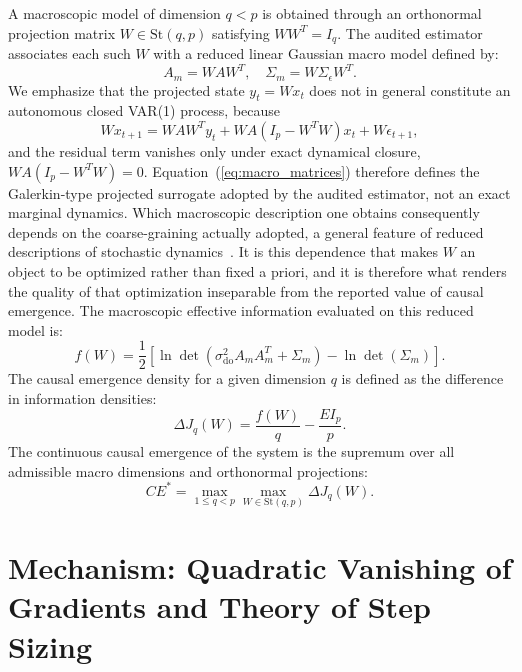 \documentclass[preprint,12pt]{elsarticle}
\begin{document}
A macroscopic model of dimension $q < p$ is obtained through an orthonormal projection matrix $W \in \mathrm{St}(q, p)$ satisfying $W W^T = I_q$. The audited estimator associates each such $W$ with a reduced linear Gaussian macro model defined by:
\begin{equation}
A_m = W A W^T, \quad \Sigma_m = W \Sigma_\epsilon W^T.
\label{eq:macro_matrices}
\end{equation}
We emphasize that the projected state $y_t = W x_t$ does not in general constitute an autonomous closed VAR(1) process, because
\begin{equation}
W x_{t+1} = W A W^T y_t + W A (I_p - W^T W) x_t + W \epsilon_{t+1},
\label{eq:closure_defect}
\end{equation}
and the residual term vanishes only under exact dynamical closure, $W A (I_p - W^T W) = 0$. Equation~(\ref{eq:macro_matrices}) therefore defines the Galerkin-type projected surrogate adopted by the audited estimator, not an exact marginal dynamics. Which macroscopic description one obtains consequently depends on the coarse-graining actually adopted, a general feature of reduced descriptions of stochastic dynamics~\cite{Gaveau2025}. It is this dependence that makes $W$ an object to be optimized rather than fixed a priori, and it is therefore what renders the quality of that optimization inseparable from the reported value of causal emergence. The macroscopic effective information evaluated on this reduced model is:
\begin{equation}
f(W) = \frac{1}{2} \left[ \ln\det(\sigma_{\mathrm{do}}^2 A_m A_m^T + \Sigma_m) - \ln\det(\Sigma_m) \right].
\label{eq:macro_obj}
\end{equation}
The causal emergence density for a given dimension $q$ is defined as the difference in information densities:
\begin{equation}
\Delta J_q(W) = \frac{f(W)}{q} - \frac{EI_p}{p}.
\label{eq:delta_j}
\end{equation}
The continuous causal emergence of the system is the supremum over all admissible macro dimensions and orthonormal projections:
\begin{equation}
CE^* = \max_{1 \le q < p} \max_{W \in \mathrm{St}(q, p)} \Delta J_q(W).
\label{eq:cefi_def}
\end{equation}

\section{Mechanism: Quadratic Vanishing of Gradients and Theory of Step Sizing}
\end{document}
